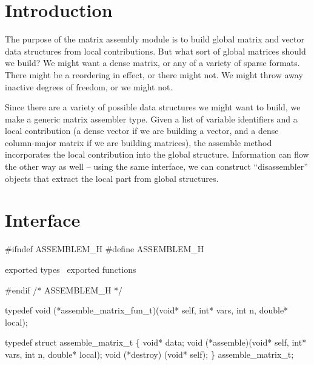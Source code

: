 
\section{Introduction}

The purpose of the matrix assembly module is to build global matrix 
and vector data structures from local contributions.  But what sort of global
matrices should we build?  We might want a dense matrix, or any of
a variety of sparse formats.  There might be a reordering in effect,
or there might not.  We might throw away inactive degrees of freedom,
or we might not.

Since there are a variety of possible data structures we might want
to build, we make a generic matrix assembler type.  Given a list of
variable identifiers and a local contribution (a dense vector if we
are building a vector, and a dense column-major matrix if we are
building matrices), the assemble method incorporates the local contribution
into the global structure.  Information can flow the other way as well --
using the same interface, we can construct ``disassembler'' objects that
extract the local part from global structures.


\section{Interface}

\endmoddef
#ifndef ASSEMBLEM_H
#define ASSEMBLEM_H

\LA{}exported types~{\nwtagstyle{}}\RA{}
\LA{}exported functions~{\nwtagstyle{}}\RA{}

#endif /* ASSEMBLEM_H */
\nwendcode{}\nwdocspar

\nwenddocs{}\endmoddef
typedef void (*assemble_matrix_fun_t)(void* self, int* vars, int n, 
                                      double* local);

typedef struct assemble_matrix_t \{
    void*   data;
    void  (*assemble)(void* self, int* vars, int n, double* local);
    void  (*destroy) (void* self);
\} assemble_matrix_t;

\nwendcode{}\nwdocspar

